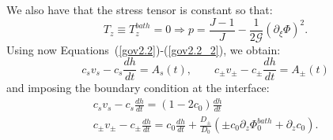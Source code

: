 \documentclass[12pt]{extarticle}
\begin{document}
We also have that the stress tensor is constant so that:
\begin{equation}
T_z\equiv T^{bath}_z=0 \Rightarrow p = \frac{J-1}{J}-\frac{1}{2\mathcal{G}} (\partial_\xi \Phi)^2.
\end{equation}
Using now Equations~(\ref{gov2.2})-(\ref{gov2.2_2}), we obtain:
\begin{equation}
c_s v_s - c_s \frac{dh}{dt}=A_s(t), \qquad c_\pm v_\pm - c_\pm \frac{dh}{dt}=A_\pm(t)
\end{equation}
and imposing the boundary condition at the interface:
\begin{gather}
c_s v_s - c_s \frac{dh}{dt}=(1-2c_0)\frac{dh}{dt}\\
c_\pm v_\pm - c_\pm \frac{dh}{dt}=c_0 \frac{dh}{dt}  +\frac{D_\pm}{D_0}\left(\pm c_0 \partial_z \Phi^{bath}_0+\partial_z c_0\right).
\end{gather}
\end{document}
